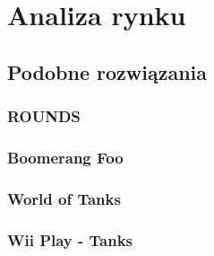 \chapter{Analiza rynku}
\section{Podobne rozwiązania}
\subsection{ROUNDS}

\subsection{Boomerang Foo}

\subsection{World of Tanks}

\subsection{Wii Play - Tanks}

